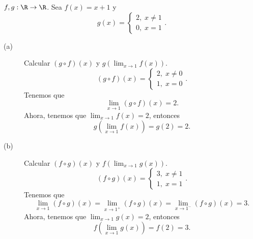 \begin{eg}
\normalfont $\displaystyle f, g : \R \to \R $. Sea $\displaystyle f\left(x\right) = x + 1 $ y 
\[g\left(x\right) = 
\begin{cases}
2, \; x \neq 1 \\
0, \; x = 1
\end{cases}
.\]
\begin{description}
\item[(a)] Calcular $\displaystyle \left(g \circ f\right)\left(x\right) $ y $\displaystyle g\left(\lim_{x \to 1}f\left(x\right)\right) $.\\
\[\left(g \circ f\right)\left(x\right) = 
\begin{cases}
2, \; x \neq 0 \\
1, \; x = 0
\end{cases}
.\]
Tenemos que 
\[\lim_{x \to 1}\left(g\circ f\right)\left(x\right) = 2 .\]
Ahora, tenemos que $\displaystyle \lim_{x \to 1}f\left(x\right) = 2 $, entonces 
\[g\left(\lim_{x \to 1}f\left(x\right)\right) = g\left(2\right) = 2 .\]
\item[(b)] Calcular $\displaystyle \left(f \circ g\right)\left(x\right) $ y $\displaystyle f\left(\lim_{x \to 1}g\left(x\right)\right) $.
\[\left(f \circ g\right)\left(x\right) = 
\begin{cases}
3, \; x \neq 1\\
1, \; x = 1
\end{cases}
.\]
Tenemos que 
\[\lim_{x \to 1}\left(f\circ g\right)\left(x\right) = \lim_{x \to 1^{+}}\left(f \circ g\right) \left(x\right) = \lim_{x \to 1^{-}}\left(f \circ g\right)\left(x\right) = 3 .\]
Ahora, tenemos que $\displaystyle \lim_{x \to 1}g\left(x\right) = 2 $, entonces 
\[f\left(\lim_{x \to 1}g\left(x\right)\right) = f\left(2\right) = 3 .\]
\end{description}
\end{eg}

